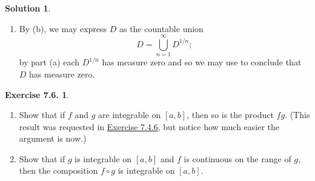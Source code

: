 \documentclass[12pt]{article}
\makeatletter
\theoremstyle{definition}
\theoremstyle{exercise}
\newtheorem{exercise}{Exercise 7.6.}
\theoremstyle{solution}
\newtheorem*{solution}{Solution}
\newcommand{\quand}{\quad \text{and} \quad}
\newcommand{\quimplies}{\quad \implies \quad}
\DeclarePairedDelimiter\abs{\lvert}{\rvert}
\let\oldabs\abs
\def\abs{\@ifstar{\oldabs}{\oldabs*}}
\DeclarePairedDelimiter\paren{(}{)}
\let\oldparen\paren
\def\paren{\@ifstar{\oldparen}{\oldparen*}}
\makeatother
\begin{document}
\begin{solution}
\begin{enumerate}
        Otherwise, suppose \( E = \{ x_{k_1}, \ldots, x_{k_m} \} \). Define
        \[
            r = \frac{\epsilon - \sum_{k \in A} \Delta x_k}{2m} > 0 \quand U_j = \paren{ x_{k_j} - \frac{r}{2}, x_{k_j} + \frac{r}{2} }.
        \]
        Then
        \[
            \sum_{j=1}^m \abs{U_j} = \sum_{j=1}^m r = \frac{\epsilon - \sum_{k \in A} \Delta x_k}{2} \quimplies \sum_{k \in A} \Delta x_k + \sum_{j=1}^m \abs{U_j} = \frac{\epsilon + \sum_{k \in A} \Delta x_k}{2} < \epsilon.
        \]
        Thus \( \{ (x_{k-1}, x_k) : k \in A \} \cup \{ U_1, \ldots, U_m \} \) is a finite collection of open intervals whose union contains \( D^{\alpha} \) and whose total length is strictly less than \( \epsilon \). We may conclude that \( D^{\alpha} \) has measure zero.

        \item By  (b), we may express \( D \) as the countable union
        \[
            D = \bigcup_{n=1}^{\infty} D^{1/n};
        \]
        by part (a) each \( D^{1/n} \) has measure zero and so we may use  to conclude that \( D \) has measure zero.
    \end{enumerate}
\end{solution}

\begin{exercise}
\label{ex:13}
    \begin{enumerate}
        \item Show that if \( f \) and \( g \) are integrable on \( [a, b] \), then so is the product \( fg \). (This result was requested in \href{https://lew98.github.io/Mathematics/UA_Section_7_4_Exercises.pdf}{Exercise 7.4.6}, but notice how much easier the argument is now.)

        \item Show that if \( g \) is integrable on \( [a, b] \) and \( f \) is continuous on the range of \( g \), then the composition \( f \circ g \) is integrable on \( [a, b] \).
    \end{enumerate}
\end{exercise}
\end{document}

